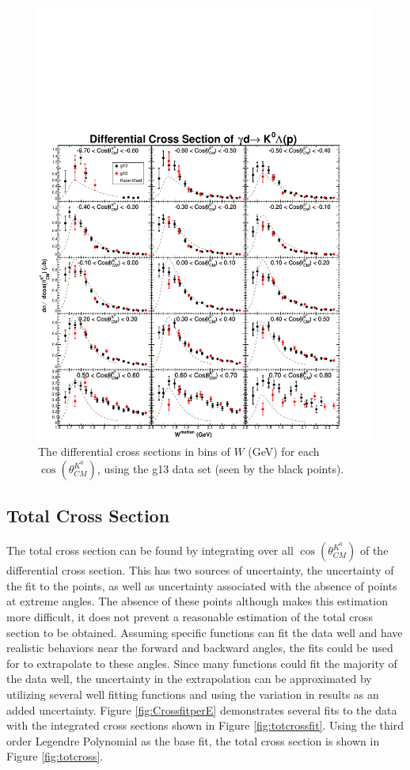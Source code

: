 \documentclass[prb,10pt,twocolumn,tightenlines,superscriptaddress]{revtex4-1}
\begin{document}
\begin{figure}[h]
    \centering
      \includegraphics[width=6in, keepaspectratio=true]{crossSectionAngleWK1offKSoff}
    \caption{The differential cross sections in bins of $W$ (GeV) for each $\cos(\theta^{K^{0}}_{CM})$, using the g13 data set (seen by the black points).}
        \label{fig:XSenergyW}%
\end{figure}

\FloatBarrier
\subsection{Total Cross Section}
The total cross section can be found by integrating over all $\cos(\theta^{K^{0}}_{CM})$ of the differential cross section. This has two sources of uncertainty, the uncertainty of the fit to the points, as well as uncertainty associated with the absence of points at extreme angles. The absence of these points although makes this estimation more difficult, it does not prevent a reasonable estimation of the total cross section to be obtained. Assuming specific functions can fit the data well and have realistic behaviors near the forward and backward angles, the fits could be used for to extrapolate to these angles. Since many functions could fit the majority of the data well, the uncertainty in the extrapolation can be approximated by utilizing several well fitting functions and using the variation in results as an added uncertainty. Figure \ref{fig:CrossfitperE} demonstrates several fits to the data with the integrated cross sections shown in Figure \ref{fig:totcrossfit}. Using the third order Legendre Polynomial as the base fit, the total cross section is shown in Figure \ref{fig:totcross}.
\end{document}
